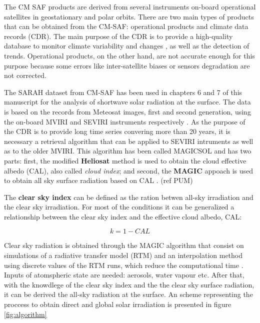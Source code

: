 The CM SAF products are derived from several instruments on-board operational satellites in geostationary and polar orbits. There are two main types of products that can be obtained from the CM-SAF: operational products and climate data records (CDR). The main purpose of the CDR is to provide a high-quality database to monitor climate variability and changes \cite*{Muller2015}, as well as the detection of trends. Operational products, on the other hand, are not accurate enough for this purpose because some errors like inter-satellite biases or sensors degradation are not corrected.

The SARAH dataset from CM-SAF has been used in chapters 6 and 7 of this manuscript for the analysis of shortwave solar radiation at the surface. The data is based on the records from Meteosat images, first and second generation, using the on-board MVIRI and SEVIRI instruments respectively \cite*{Posselt2012}. As the purpose of the CDR is to provide long time series convering more than 20 years, it is necessary a retrieval algorithm that can be applied to SEVIRI intruments as well as to the older MVIRI. This algorithm has been called MAGICSOL and has two parts: first, the modified \textbf{Heliosat} method is used to obtain the cloud effective albedo (CAL), also called \textit{cloud index};  and second, the \textbf{MAGIC} appoach is used to obtain all sky surface radiation based on CAL \cite*{Posselt2012}. (ref PUM)

The \textbf{clear sky index} can be defined as the ration betwen all-sky irradiation and the clear sky irradiation. For most of the conditions it can be generalized a relationship between the clear sky index and the effective cloud albedo, CAL:

\begin{equation}
  k=1-CAL
\end{equation}

Clear sky radiation is obtained through the MAGIC algorithm \cite*{mueller2009} that consist on simulations of a radiative transfer model (RTM) and an interpolation method using discrete values of the RTM runs, which reduce the computational time \cite*{mueller2009}. Inputs of atomspheric state are needed: aerosols, water vapour etc. After that, with the knowdlege of the clear sky index and the the clear sky surface radiation, it can be derived the all-sky radiation at the surface. An scheme representing the proccess to obtain direct and global solar irradiation is presented in figure \ref{fig:algorithm}\\

